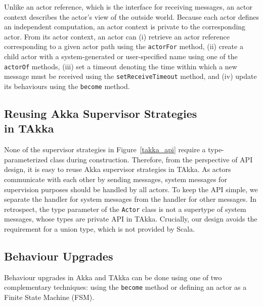 Unlike an actor reference, which is the interface for receiving messages, 
an actor context describes the actor's view of the outside world.   Because 
each actor defines an independent computation, an actor context is private to 
the corresponding actor.  From its 
actor context, an actor can (i) retrieve an actor reference 
corresponding to a given actor path using the {\tt actorFor} method, (ii) 
create a child actor with a system-generated or user-specified name using one 
of the {\tt actorOf} methods, (iii) set a timeout denoting the time within which
a new message must be received using the {\tt setReceiveTimeout} method, and
(iv) update its behaviours using the {\tt become} method.  







\subsection{Reusing Akka Supervisor Strategies \\ in TAkka}
\label{supervision}

None of the supervisor strategies in Figure~\ref{takka_api} require a 
type-parameterized class during construction.  Therefore, from the perspective 
of API design, it is easy to reuse Akka supervisor strategies in TAkka.  
As actors communicate with each other by sending messages, system messages for 
supervision purposes should be handled by all  actors.  
To keep the API simple, we separate the handler for system messages from the
handler for other messages.  In retrospect, the type parameter of the {\tt Actor}
class is not a supertype of system messages, whose types are private 
API in TAkka.  Crucially, our design avoids the requirement for a union type, 
which is not provided by Scala.


\subsection{Behaviour Upgrades}

Behaviour upgrades in Akka and TAkka can be done using one of two complementary 
techniques: using the {\tt become} method or defining an actor as a Finite State Machine (FSM).


